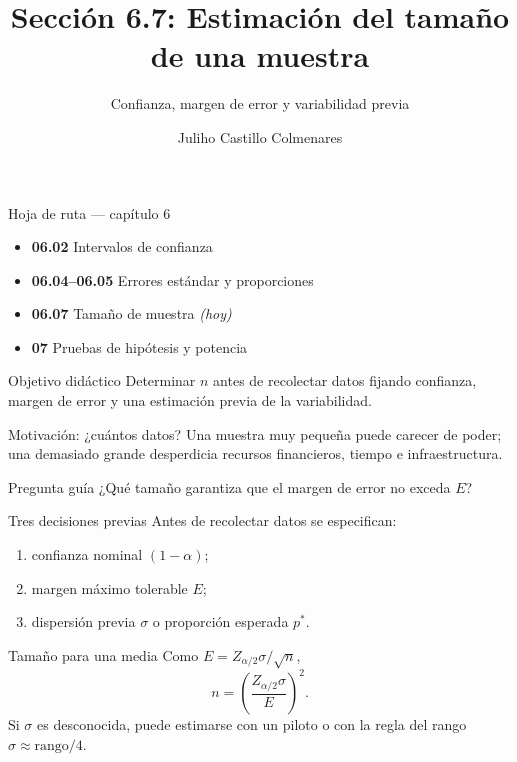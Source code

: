 \documentclass[10pt,aspectratio=169]{beamer}
\title[Tamaño de una muestra]{Sección 6.7: Estimación del tamaño de una muestra}
\subtitle{Confianza, margen de error y variabilidad previa}
\author[J. Castillo Colmenares]{Juliho Castillo Colmenares}
\institute{Tecnológico de Monterrey}
\date{}
\begin{document}
\begin{frame}[plain]\vspace{-0.8cm}\titlepage\end{frame}

\begin{frame}{Hoja de ruta --- capítulo 6}
  \footnotesize
  \begin{itemize}\itemsep=0.08cm
    \item \textbf{06.02} Intervalos de confianza
    \item \textbf{06.04--06.05} Errores estándar y proporciones
    \item \textbf{06.07} Tamaño de muestra \emph{(hoy)}
    \item \textbf{07} Pruebas de hipótesis y potencia
  \end{itemize}
  \begin{block}{Objetivo didáctico}
    Determinar $n$ antes de recolectar datos fijando confianza, margen de error y
    una estimación previa de la variabilidad.
  \end{block}
\end{frame}

\begin{frame}{Motivación: ¿cuántos datos?}
  \footnotesize
  Una muestra muy pequeña puede carecer de poder; una demasiado grande
  desperdicia recursos financieros, tiempo e infraestructura.
  \begin{alertblock}{Pregunta guía}
    ¿Qué tamaño garantiza que el margen de error no exceda $E$?
  \end{alertblock}
\end{frame}

\begin{frame}{Tres decisiones previas}
  \footnotesize
  Antes de recolectar datos se especifican:
  \begin{enumerate}\itemsep=0.12cm
    \item confianza nominal $(1-\alpha)$;
    \item margen máximo tolerable $E$;
    \item dispersión previa $\sigma$ o proporción esperada $p^*$.
  \end{enumerate}
\end{frame}

\begin{frame}{Tamaño para una media}
  \footnotesize
  Como $E=Z_{\alpha/2}\sigma/\sqrt n$,
  \[
    n=\left(\frac{Z_{\alpha/2}\sigma}{E}\right)^2.
  \]
  Si $\sigma$ es desconocida, puede estimarse con un piloto o con la regla del
  rango $\sigma\approx\text{rango}/4$.
\end{frame}
\end{document}

